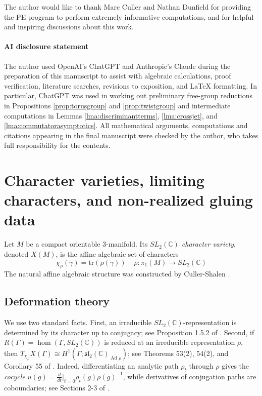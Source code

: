 \documentclass{article}
\newcommand{\Ad}{\operatorname{Ad}}
\newcommand{\sltwo}{\mathfrak{sl}_2}
\theoremstyle{plain}
\theoremstyle{definition}
\theoremstyle{plain}
\theoremstyle{plain}
\theoremstyle{plain}
\theoremstyle{remark}
\theoremstyle{remark}
\theoremstyle{plain}
\theoremstyle{plain}
\theoremstyle{plain}
\theoremstyle{plain}
\begin{document}
The author would like to thank Marc Culler and Nathan Dunfield for providing the PE program to perform extremely informative computations, and for helpful and inspiring discussions about this work. 

\paragraph{AI disclosure statement}

The author used OpenAI's ChatGPT and Anthropic's Claude during the preparation of this manuscript to assist with algebraic calculations, proof verification, literature searches, revisions to exposition, and LaTeX formatting. In particular, ChatGPT was used in working out preliminary free-group reductions in Propositions \ref{prop:torusgroup} and \ref{prop:twistgroup} and intermediate computations in Lemmas \ref{lma:discriminantterms}, \ref{lma:crossjet}, and \ref{lma:commutatorasymptotics}. All mathematical arguments, computations and citations appearing in the final manuscript were checked by the author, who takes full responsibility for the contents. 

\section{Character varieties, limiting characters, and non-realized gluing data}\label{sec:cullershalen}

Let $M$ be a compact orientable 3-manifold. Its \emph{$SL_2(\mathbb{C})$ character variety}, denoted $X(M)$, is the affine algebraic set of characters
\begin{equation*}
	\chi_\rho(\gamma) = \mathrm{tr}(\rho(\gamma)) \ \ \ \ \ \rho: \pi_1(M) \to SL_2(\mathbb{C})
\end{equation*}
The natural affine algebraic structure was constructed by Culler-Shalen \cite{cullershalen}.

\subsection{Deformation theory}

We use two standard facts. First, an irreducible $SL_2(\mathbb{C})$-representation is determined by its character up to conjugacy; see Proposition 1.5.2 of \cite{cullershalen}. Second, if $R(\Gamma) = \hom(\Gamma, SL_2(\mathbb{C}))$ is reduced at an irreducible representation $\rho$, then $T_{\chi_\rho}X(\Gamma) \cong H^1(\Gamma; \sltwo(\mathbb{C})_{\Ad\rho})$; see Theorems 53(2), 54(2), and Corollary 55 of \cite{sikora}. Indeed, differentiating an analytic path $\rho_t$ through $\rho$ gives the \emph{cocycle} $u(g) = \frac{d}{dt}|_{t=0}\rho_t(g)\rho(g)^{-1}$, while derivatives of conjugation paths are coboundaries; see Sections 2-3 of \cite{weil}.
\end{document}

